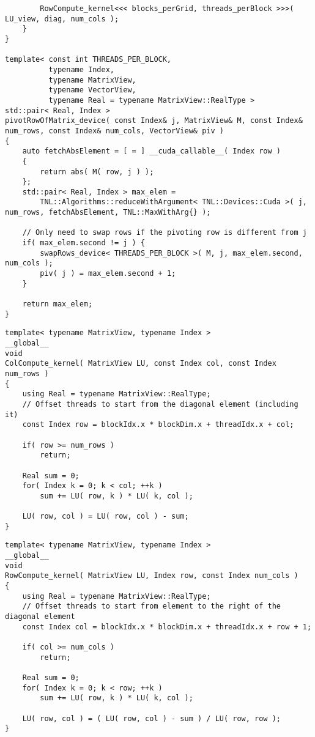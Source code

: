\begin{lstlisting}
		RowCompute_kernel<<< blocks_perGrid, threads_perBlock >>>( LU_view, diag, num_cols );
	}
}

template< const int THREADS_PER_BLOCK,
		  typename Index,
		  typename MatrixView,
		  typename VectorView,
		  typename Real = typename MatrixView::RealType >
std::pair< Real, Index >
pivotRowOfMatrix_device( const Index& j, MatrixView& M, const Index& num_rows, const Index& num_cols, VectorView& piv )
{
	auto fetchAbsElement = [ = ] __cuda_callable__( Index row )
	{
		return abs( M( row, j ) );
	};
	std::pair< Real, Index > max_elem =
		TNL::Algorithms::reduceWithArgument< TNL::Devices::Cuda >( j, num_rows, fetchAbsElement, TNL::MaxWithArg{} );
	
	// Only need to swap rows if the pivoting row is different from j
	if( max_elem.second != j ) {
		swapRows_device< THREADS_PER_BLOCK >( M, j, max_elem.second, num_cols );
		piv( j ) = max_elem.second + 1;
	}
	
	return max_elem;
}
\end{lstlisting}

\begin{lstlisting}[caption={Implementation of the \code{ColCompute\_kernel()} kernel which computes one column of \code{LU}.},label={Listing:PCMxPP-implementation->kernels->column-compute-kernel}]
template< typename MatrixView, typename Index >
__global__
void
ColCompute_kernel( MatrixView LU, const Index col, const Index num_rows )
{
	using Real = typename MatrixView::RealType;
	// Offset threads to start from the diagonal element (including it)
	const Index row = blockIdx.x * blockDim.x + threadIdx.x + col;
	
	if( row >= num_rows )
		return;
	
	Real sum = 0;
	for( Index k = 0; k < col; ++k )
		sum += LU( row, k ) * LU( k, col );
	
	LU( row, col ) = LU( row, col ) - sum;
}
\end{lstlisting}

\begin{lstlisting}[caption={Implementation of the \code{RowCompute\_kernel()} kernel which computes one row of \code{LU}.},label={Listing:PCMxPP-implementation->kernels->row-compute-kernel}]
template< typename MatrixView, typename Index >
__global__
void
RowCompute_kernel( MatrixView LU, Index row, const Index num_cols )
{
	using Real = typename MatrixView::RealType;
	// Offset threads to start from element to the right of the diagonal element
	const Index col = blockIdx.x * blockDim.x + threadIdx.x + row + 1;
	
	if( col >= num_cols )
		return;
	
	Real sum = 0;
	for( Index k = 0; k < row; ++k )
		sum += LU( row, k ) * LU( k, col );
	
	LU( row, col ) = ( LU( row, col ) - sum ) / LU( row, row );
}
\end{lstlisting}





